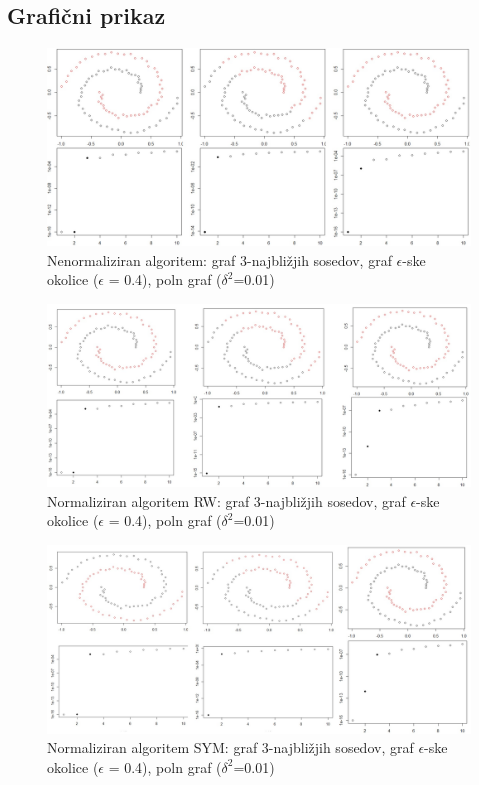 \documentclass[a4paper, 10pt]{article}
\begin{document}
\subsection{Grafični prikaz}

\begin{figure}[h]
\caption{Nenormaliziran algoritem: graf 3-najbližjih sosedov, graf $\epsilon$-ske okolice ($\epsilon$ = 0.4), poln graf ($\delta^2$=0.01)}
\includegraphics[width=\textwidth]{unnorm-spiral}
\end{figure}

\begin{figure}[h]
\caption{Normaliziran algoritem RW: graf 3-najbližjih sosedov, graf $\epsilon$-ske okolice ($\epsilon$ = 0.4), poln graf ($\delta^2$=0.01)}
\includegraphics[width=\textwidth]{norm-spiral}
\end{figure}

\begin{figure}[h]
\caption{Normaliziran algoritem SYM: graf 3-najbližjih sosedov, graf $\epsilon$-ske okolice ($\epsilon$ = 0.4), poln graf ($\delta^2$=0.01)}
\includegraphics[width=\textwidth]{norm-spiral-sym}
\end{figure}
\end{document}
